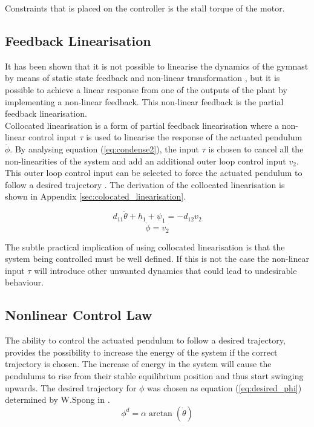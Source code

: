 Constraints that is placed on the controller is the stall torque of the motor. 

\subsection{Feedback Linearisation}
It has been shown that it is not possible to linearise the dynamics of the gymnast by means of static state feedback and non-linear transformation \cite{murray}, but it is possible to achieve a linear response from one of the outputs of the plant by implementing a non-linear feedback. This non-linear feedback is the partial feedback linearisation.\\

Collocated linearisation is a form of partial feedback linearisation where a non-linear control input $\tau$ is used to linearise the response of the actuated pendulum $\ddot{\phi}$. By analysing equation (\ref{eq:condense2}), the input $\tau$ is chosen to cancel all the non-linearities of the system and add an additional outer loop control input $v_{2}$. This outer loop control input can be selected to force the actuated pendulum to follow a desired trajectory \citep{spong_swingup}. The derivation of the collocated linearisation is shown in Appendix \ref{sec:colocated_linearisation}.

\begin{equation} \label{eq:collocated_lin1}
d_{11}\ddot{\theta} + h_{1} + \psi_{1} = -d_{12}v_{2}
\end{equation}
\begin{equation} \label{eq:collocated_lin2}
\ddot{\phi} = v_{2}
\end{equation}

The subtle practical implication of using collocated linearisation is that the system being controlled must be well defined. If this is not the case the non-linear input $\tau$ will introduce other unwanted dynamics that could lead to undesirable behaviour.

\subsection{Nonlinear Control Law}

The ability to control the actuated pendulum to follow a desired trajectory, provides the possibility to increase the energy of the system if the correct trajectory is chosen. The increase of energy in the system will cause the pendulums to rise from their stable equilibrium position and thus start swinging upwards. The desired trajectory for ${\phi}$ was chosen as equation (\ref{eq:desired_phi}) determined by W.Spong in \citep{spong_swingup}.
\begin{equation} \label{eq:desired_phi}
\phi^{d} =  \alpha \arctan(\dot{\theta})
\end{equation}


